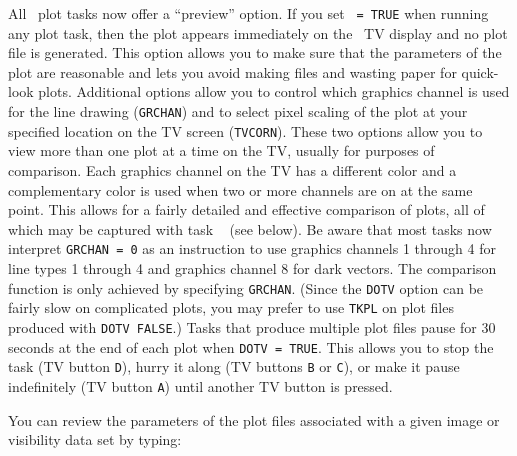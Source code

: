      All \AIPS\ plot tasks now offer a ``preview'' option.  If you set
{\tt {} = TRUE} when running any plot task, then the plot
appears immediately on the \AIPS\ TV display and no plot file is
generated. This option allows you to make sure that the parameters of
the plot are reasonable and lets you avoid making files and wasting
paper for quick-look plots.  Additional options allow you to control
which graphics channel is used for the line drawing ({\tt GRCHAN}) and
to select pixel scaling of the plot at your specified location on the
TV screen ({\tt TVCORN})\@.  These two options allow you to view
more than one plot at a time on the TV, usually for purposes of
comparison.  Each graphics channel on the TV has a different color and
a complementary color is used when two or more channels are on at the
same point.  This allows for a fairly detailed and effective
comparison of plots, all of which may be captured with task {\tt
{}} (see below).  Be aware that most tasks now interpret
{\tt GRCHAN = 0} as an instruction to use graphics channels 1 through
4 for line types 1 through 4 and graphics channel 8 for dark vectors.
The comparison function is only achieved by specifying {\tt GRCHAN}\@.
(Since the {\tt DOTV} option can be fairly slow on complicated plots,
you may prefer to use {\tt TKPL} on plot files produced with {\tt DOTV
FALSE}\@.)  Tasks that produce multiple plot files pause for 30
seconds at the end of each plot when {\tt DOTV = TRUE}\@.  This allows
you to stop the task (TV button {\tt D}), hurry it along (TV buttons
{\tt B} or {\tt C}), or make it pause indefinitely (TV button {\tt A})
until another TV button is pressed.

     You can review the parameters of the plot files associated with a
given image or visibility data set by typing:

